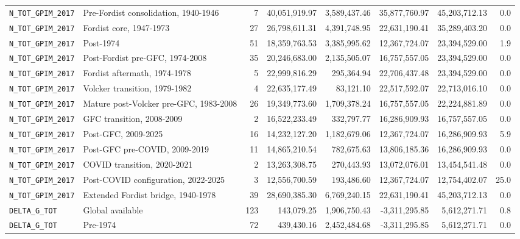 \begin{landscape}
\begin{longtable}{p{4.4cm}p{3.8cm}rrrrrr}
\\
\nolinkurl{N_TOT_GPIM_2017} & Pre-Fordist consolidation, 1940-1946 & 7 & 40,051,919.97 & 3,589,437.46 & 35,877,760.97 & 45,203,712.13 & 0.0
\\
\nolinkurl{N_TOT_GPIM_2017} & Fordist core, 1947-1973 & 27 & 26,798,611.31 & 4,391,748.95 & 22,631,190.41 & 35,289,403.20 & 0.0
\\
\nolinkurl{N_TOT_GPIM_2017} & Post-1974 & 51 & 18,359,763.53 & 3,385,995.62 & 12,367,724.07 & 23,394,529.00 & 1.9
\\
\nolinkurl{N_TOT_GPIM_2017} & Post-Fordist pre-GFC, 1974-2008 & 35 & 20,246,683.00 & 2,135,505.07 & 16,757,557.05 & 23,394,529.00 & 0.0
\\
\nolinkurl{N_TOT_GPIM_2017} & Fordist aftermath, 1974-1978 & 5 & 22,999,816.29 & 295,364.94 & 22,706,437.48 & 23,394,529.00 & 0.0
\\
\nolinkurl{N_TOT_GPIM_2017} & Volcker transition, 1979-1982 & 4 & 22,635,177.49 & 83,121.10 & 22,517,592.07 & 22,713,016.10 & 0.0
\\
\nolinkurl{N_TOT_GPIM_2017} & Mature post-Volcker pre-GFC, 1983-2008 & 26 & 19,349,773.60 & 1,709,378.24 & 16,757,557.05 & 22,224,881.89 & 0.0
\\
\nolinkurl{N_TOT_GPIM_2017} & GFC transition, 2008-2009 & 2 & 16,522,233.49 & 332,797.77 & 16,286,909.93 & 16,757,557.05 & 0.0
\\
\nolinkurl{N_TOT_GPIM_2017} & Post-GFC, 2009-2025 & 16 & 14,232,127.20 & 1,182,679.06 & 12,367,724.07 & 16,286,909.93 & 5.9
\\
\nolinkurl{N_TOT_GPIM_2017} & Post-GFC pre-COVID, 2009-2019 & 11 & 14,865,210.54 & 782,675.63 & 13,806,185.36 & 16,286,909.93 & 0.0
\\
\nolinkurl{N_TOT_GPIM_2017} & COVID transition, 2020-2021 & 2 & 13,263,308.75 & 270,443.93 & 13,072,076.01 & 13,454,541.48 & 0.0
\\
\nolinkurl{N_TOT_GPIM_2017} & Post-COVID configuration, 2022-2025 & 3 & 12,556,700.59 & 193,486.60 & 12,367,724.07 & 12,754,402.07 & 25.0
\\
\nolinkurl{N_TOT_GPIM_2017} & Extended Fordist bridge, 1940-1978 & 39 & 28,690,385.30 & 6,769,240.15 & 22,631,190.41 & 45,203,712.13 & 0.0
\\
\nolinkurl{DELTA_G_TOT} & Global available & 123 & 143,079.25 & 1,906,750.43 & -3,311,295.85 & 5,612,271.71 & 0.8
\\
\nolinkurl{DELTA_G_TOT} & Pre-1974 & 72 & 439,430.16 & 2,452,484.68 & -3,311,295.85 & 5,612,271.71 & 0.0
\\

\end{longtable}
\end{landscape}

